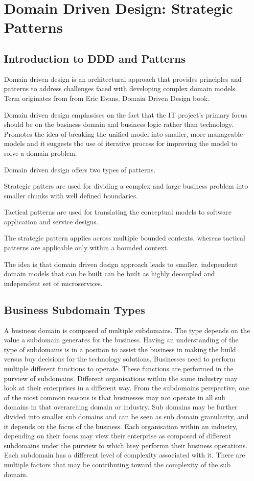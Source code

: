 \chapter{Domain Driven Design: Strategic Patterns}

\section{Introduction to DDD and Patterns}
Domain driven design is an architectural approach that provides principles and patterns to address challenges faced with developing complex domain models.
Term originates from from Eric Evans, Domain Driven Design book.

Domain driven design emphasises on the fact that the IT project's primary focus should be on the business domain and business logic rather than technology.
Promotes the idea of breaking the unified model into smaller, more manageable models and it suggests the use of iterative process for improving the model to solve a domain problem.

Domain driven design offers two types of patterns.

Strategic patters are used for dividing a complex and large business problem into smaller chunks with well defined boundaries.

Tactical patterns are used for translating the conceptual models to software application and service designs.

The strategic pattern applies across multiple bounded contexts, whereas tactical patterns are applicable only within a bounded context.

The idea is that domain driven design approach leads to smaller, independent domain models that can be built can be built as highly decoupled and independent set of microservices.

\section{Business Subdomain Types}
A business domain is composed of multiple subdomains.
The type depends on the value a subdomain generates for the business.
Having an understanding of the type of subdomains is in a position to assist the business in making the build versus buy decisions for the technology solutions.
Businesses need to perform multiple different functions to operate.
These functions are performed in the purview of subdomains.
Different organisations within the same industry may look at their enterprises in a different way.
From the subdomains perspective, one of the most common reasons is that businesses may not operate in all sub domains in that overarching domain or industry.
Sub domains may be further divided into smaller sub domains and can be seen as sub domain granularity, and it depends on the focus of the business.
Each organisation within an industry, depending on their focus may view their enterprise as composed of different subdomains under the purview fo which htey performn their business operations.
Each subdomain has a different level of complexity associated with it.
There are multiple factors that may be contributing toward the complexity of the sub domain.


